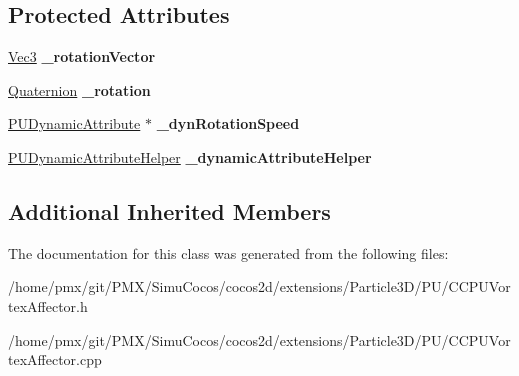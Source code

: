 \subsection*{Protected Attributes}
\begin{DoxyCompactItemize}
\item 
\mbox{\label{classPUVortexAffector_a7dd49b086cff3188a3a98081e66cac90}} 
\hyperlink{classVec3}{Vec3} {\bfseries \+\_\+rotation\+Vector}
\item 
\mbox{\label{classPUVortexAffector_a4870f542c23895d8718cbee18abb04a2}} 
\hyperlink{classQuaternion}{Quaternion} {\bfseries \+\_\+rotation}
\item 
\mbox{\label{classPUVortexAffector_a74c83875563073791446c4b4e1442fbc}} 
\hyperlink{classPUDynamicAttribute}{P\+U\+Dynamic\+Attribute} $\ast$ {\bfseries \+\_\+dyn\+Rotation\+Speed}
\item 
\mbox{\label{classPUVortexAffector_affe814d42e22864fe575d792aae66e5c}} 
\hyperlink{classPUDynamicAttributeHelper}{P\+U\+Dynamic\+Attribute\+Helper} {\bfseries \+\_\+dynamic\+Attribute\+Helper}
\end{DoxyCompactItemize}
\subsection*{Additional Inherited Members}


The documentation for this class was generated from the following files\+:\begin{DoxyCompactItemize}
\item 
/home/pmx/git/\+P\+M\+X/\+Simu\+Cocos/cocos2d/extensions/\+Particle3\+D/\+P\+U/C\+C\+P\+U\+Vortex\+Affector.\+h\item 
/home/pmx/git/\+P\+M\+X/\+Simu\+Cocos/cocos2d/extensions/\+Particle3\+D/\+P\+U/C\+C\+P\+U\+Vortex\+Affector.\+cpp\end{DoxyCompactItemize}
